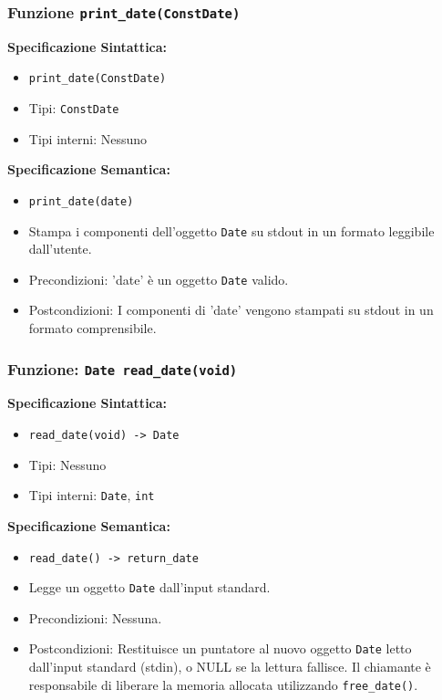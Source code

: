 \documentclass[11pt]{scrartcl} %
\begin{document}
\subsubsection{Funzione \texttt{print\_date(ConstDate)}}

\textbf{Specificazione Sintattica:}
\begin{itemize}
	\item \texttt{print\_date(ConstDate)}
	\item Tipi: \texttt{ConstDate}
	\item Tipi interni: Nessuno
\end{itemize}

\textbf{Specificazione Semantica:}
\begin{itemize}
	\item \texttt{print\_date(date)}
	\item Stampa i componenti dell'oggetto \texttt{Date} su stdout in un formato leggibile dall'utente.
	\item Precondizioni: 'date' è un oggetto \texttt{Date} valido.
	\item Postcondizioni: I componenti di 'date' vengono stampati su stdout in un formato comprensibile.
\end{itemize}

\subsubsection{Funzione: \texttt{Date read\_date(void)}}

\textbf{Specificazione Sintattica:}
\begin{itemize}
	\item \texttt{read\_date(void) -> Date}
	\item Tipi: Nessuno
	\item Tipi interni: \texttt{Date}, \texttt{int}
\end{itemize}

\textbf{Specificazione Semantica:}
\begin{itemize}
	\item \texttt{read\_date() -> return\_date}
	\item Legge un oggetto \texttt{Date} dall'input standard.
	\item Precondizioni: Nessuna.
	\item Postcondizioni: Restituisce un puntatore al nuovo oggetto \texttt{Date} letto dall'input standard (stdin), o NULL se la lettura fallisce. Il chiamante è responsabile di liberare la memoria allocata utilizzando \texttt{free\_date()}.
\end{itemize}
\end{document}
